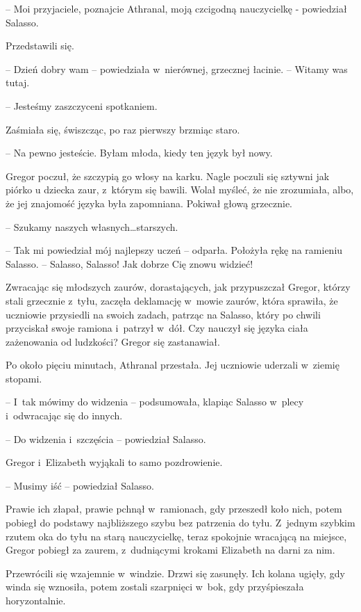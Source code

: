 \documentclass[oneside,polish,12pt,sfheadings]{mwbk}
\begin{document}
-- Moi przyjaciele, poznajcie Athranal, moją czcigodną nauczycielkę -
powiedział Salasso.

Przedstawili się.

-- Dzień dobry wam -- powiedziała w~nierównej, grzecznej łacinie. -- Witamy
was tutaj.

-- Jesteśmy zaszczyceni spotkaniem.

Zaśmiała się, świszcząc, po raz pierwszy brzmiąc staro.

-- Na pewno jesteście. Byłam młoda, kiedy ten język był nowy.

Gregor poczuł, że szczypią go włosy na karku. Nagle poczuli się sztywni
jak piórko u dziecka zaur, z~którym się bawili. Wolał myśleć, że nie
zrozumiała, albo, że jej znajomość języka była zapomniana. Pokiwał głową
grzecznie.

-- Szukamy naszych własnych\ldots starszych.

-- Tak mi powiedział mój najlepszy uczeń -- odparła. Położyła rękę na
ramieniu Salasso. -- Salasso, Salasso! Jak dobrze Cię znowu widzieć!

Zwracając się młodszych zaurów, dorastających, jak przypuszczał Gregor,
którzy stali grzecznie z~tyłu, zaczęła deklamację w~mowie zaurów, która
sprawiła, że uczniowie przysiedli na swoich zadach, patrząc na Salasso,
który po chwili przyciskał swoje ramiona i~patrzył w~dół. Czy nauczył
się języka ciała zażenowania od ludzkości? Gregor się zastanawiał.

Po około pięciu minutach, Athranal przestała. Jej uczniowie uderzali w~ziemię stopami.

-- I~tak mówimy do widzenia -- podsumowała, klapiąc Salasso w~plecy i~odwracając się do innych.

-- Do widzenia i~szczęścia -- powiedział Salasso.

Gregor i~Elizabeth wyjąkali to samo pozdrowienie.

-- Musimy iść -- powiedział Salasso.

Prawie ich złapał, prawie pchnął w~ramionach, gdy przeszedł koło nich,
potem pobiegł do podstawy najbliższego szybu bez patrzenia do tyłu. Z~jednym szybkim rzutem oka do tyłu na starą nauczycielkę, teraz spokojnie
wracającą na miejsce, Gregor pobiegł za zaurem, z~dudniącymi krokami
Elizabeth na darni za nim.

Przewrócili się wzajemnie w~windzie. Drzwi się zasunęły. Ich kolana
ugięły, gdy winda się wznosiła, potem zostali szarpnięci w~bok, gdy
przyśpieszała horyzontalnie.
\end{document}
